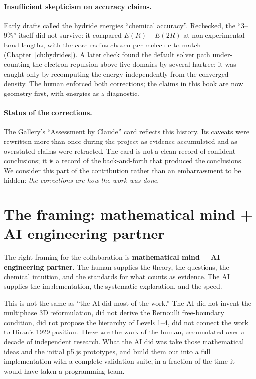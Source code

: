\paragraph{Insufficient skepticism on accuracy claims.}
Early drafts called the hydride energies ``chemical accuracy''. Rechecked, the ``3--9\%'' itself did not survive: it compared $E(R)-E(2R)$ at non-experimental bond lengths, with the core radius chosen per molecule to match (Chapter~\ref{ch:hydrides}). A later check found the default solver path under-counting the electron repulsion above five domains by several hartree; it was caught only by recomputing the energy independently from the converged density. The human enforced both corrections; the claims in this book are now geometry first, with energies as a diagnostic.

\paragraph{Status of the corrections.}
The Gallery's ``Assessment by Claude'' card reflects this history. Its caveats were rewritten more than once during the project as evidence accumulated and as overstated claims were retracted. The card is not a clean record of confident conclusions; it is a record of the back-and-forth that produced the conclusions. We consider this part of the contribution rather than an embarrassment to be hidden: \emph{the corrections are how the work was done}.

\section{The framing: mathematical mind + AI engineering partner}\label{sec:framing}

The right framing for the collaboration is \textbf{mathematical mind + AI engineering partner}. The human supplies the theory, the questions, the chemical intuition, and the standards for what counts as evidence. The AI supplies the implementation, the systematic exploration, and the speed.

This is not the same as ``the AI did most of the work.'' The AI did not invent the multiphase 3D reformulation, did not derive the Bernoulli free-boundary condition, did not propose the hierarchy of Levels 1--4, did not connect the work to Dirac's 1929 position. These are the work of the human, accumulated over a decade of independent research. What the AI did was take those mathematical ideas and the initial p5.js prototypes, and build them out into a full implementation with a complete validation suite, in a fraction of the time it would have taken a programming team.

